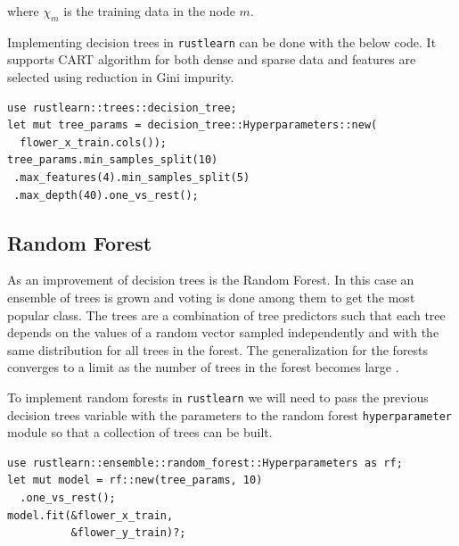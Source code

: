 \documentclass{book}
\begin{document}
where $\chi_m$ is the training data in the node $m$.

Implementing decision trees in \lstinline{rustlearn} can be done with the below code. It supports CART algorithm for both dense and sparse data and features are selected using reduction in Gini impurity\cite{WEBSITE:7}.

\begin{lstlisting}[caption={chapter3\\/rustlearn\_classification\_tasks\\/src\\/trees\\.rs}]
use rustlearn::trees::decision_tree;
let mut tree_params = decision_tree::Hyperparameters::new(
  flower_x_train.cols());
tree_params.min_samples_split(10)
 .max_features(4).min_samples_split(5)
 .max_depth(40).one_vs_rest();
\end{lstlisting}

\label{sub:Decision trees}

\subsection{Random Forest}%
As an improvement of decision trees is the Random Forest. In this case an ensemble of trees is grown and voting is done among them to get the most popular class. The trees are a combination of tree predictors such that each tree depends on the values of a random vector sampled independently and with the same distribution for all trees in the forest. The generalization for the forests converges to a limit as the number of trees in the forest becomes large\cite{WEBSITE:10} .

To implement random forests in \lstinline{rustlearn} we will need to pass the previous decision trees variable with the parameters to the random forest \lstinline{hyperparameter} module so that a collection of trees can be built.

\begin{lstlisting}[caption={chapter3\\/rustlearn\_classification\_tasks\\/src\\/trees\\.rs}]
use rustlearn::ensemble::random_forest::Hyperparameters as rf;
let mut model = rf::new(tree_params, 10)
  .one_vs_rest();
model.fit(&flower_x_train,
          &flower_y_train)?;
\end{lstlisting}
\label{sub:random_forest}
\end{document}
